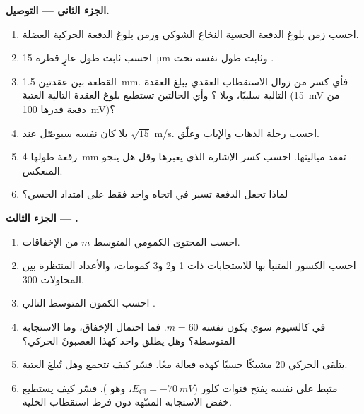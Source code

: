 \begin{problem}
\medskip
\noindent\textbf{الجزء الثاني --- التوصيل.}
\begin{enumerate}[resume]
  \item احسب زمن بلوغ الدفعة الحسية النخاع
        الشوكي وزمن بلوغ الدفعة الحركية العضلة.
  \item احسب ثابت طول  عارٍ قطره \qty{15}{\micro m}
        وثابت طول  نفسه تحت .
  \item القطعة بين عقدتين \qty{1.5}{mm}. فأي كسر من زوال الاستقطاب
        العقدي يبلغ العقدة التالية سلبيًا،  وبلا
        ؟ وأي الحالتين تستطيع بلوغ العقدة التالية
        العتبةَ (\qty{15}{mV} من دفعة قدرها \qty{100}{mV})؟
  \item بلا  كان  نفسه سيوصّل عند $\sqrt{15}$
        m/s. احسب رحلة الذهاب والإياب وعلّق.
  \item رقعة طولها \qty{4}{mm} تفقد ميالينها. احسب
        كسر الإشارة الذي يعبرها وقل هل ينجو
        المنعكس.
  \item لماذا تجعل  الدفعة تسير في
        اتجاه واحد فقط على امتداد  الحسي؟
\end{enumerate}

\medskip
\noindent\textbf{الجزء الثالث --- .}
\begin{enumerate}[resume]
  \item احسب المحتوى الكمومي المتوسط $m$ من الإخفاقات.
  \item احسب الكسور المتنبأ بها للاستجابات ذات 1 و2 و3
        كمومات، والأعداد المنتظرة بين المحاولات 300.
  \item احسب الكمون المتوسط التالي .
  \item في كالسيوم سوي يكون  نفسه $m = 60$. فما
        احتمال الإخفاق، وما الاستجابة المتوسطة؟ وهل يطلق 
        واحد كهذا العصبونَ الحركي؟
  \item يتلقى  الحركي \num{20} مشبكًا حسيًا كهذه
        فعالة معًا. فسّر كيف تتجمع وهل تُبلغ
        العتبة.
  \item {} مثبط على  نفسه يفتح قنوات كلور
        ($E_{\mathrm{Cl}} = \qty{-70}{mV}$، وهو ). فسّر كيف يستطيع خفض الاستجابة
        المنبّهة دون فرط استقطاب الخلية.
\end{enumerate}


\end{problem}
